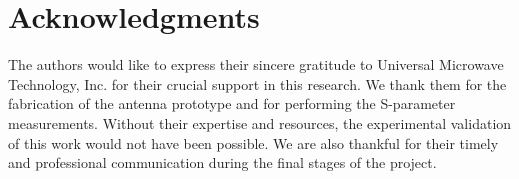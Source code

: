 \documentclass[journal]{IEEEtran}
\begin{document}
\section*{Acknowledgments}
\label{sec:acknowledgments}

The authors would like to express their sincere gratitude to Universal Microwave Technology, Inc. for their crucial support in this research. We thank them for the fabrication of the antenna prototype and for performing the S-parameter measurements. Without their expertise and resources, the experimental validation of this work would not have been possible. We are also thankful for their timely and professional communication during the final stages of the project.

\begin{figure*}[!ht]
\centering
{}
\qquad
{}
\caption{\label{fig:final-radiation}(a) Measured and simulated co-polarization radiation pattern for Port 1 at $\qty{5.2}{GHz}$ in the azimuthal plane ($\varphi=\ang{0}$). (b) Measured and simulated co-polarization radiation pattern for Port 1 at $\qty{5.2}{GHz}$ in the elevation plane ($\varphi=\ang{90}$).}
\end{figure*}
\end{document}
